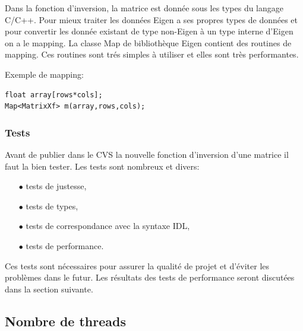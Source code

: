 Dans la fonction d'inversion, la matrice est donnée sous les types du langage
C/C++. Pour mieux traiter les données Eigen a ses propres types de données et
pour convertir les donnée existant de type non-Eigen à un type interne d'Eigen
on a le mapping. La classe Map de bibliothèque Eigen contient des routines de
mapping. Ces routines sont trés simples à utiliser et elles sont très performantes.

Exemple de mapping:


\begin{lstlisting}
float array[rows*cols];
Map<MatrixXf> m(array,rows,cols);
\end{lstlisting}


\subsubsection{Tests}

Avant de publier dans le CVS la nouvelle fonction d'inversion d'une matrice il faut la bien tester. Les tests sont nombreux et divers: 

\begin{itemize}
	\item[$\bullet$] tests de justesse,
	\item[$\bullet$] tests de types,
	\item[$\bullet$] tests de correspondance avec la syntaxe IDL,
	\item[$\bullet$] tests de performance.
\end{itemize}

Ces tests sont nécessaires pour assurer la qualité de projet et d’éviter les problèmes dans le futur. Les résultats des tests de performance seront discutées dans la section suivante.

\subsection{Nombre de threads}
\label{num_thread}

